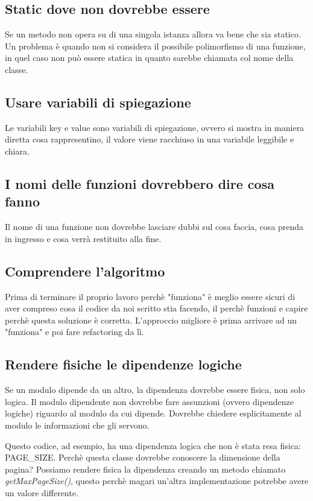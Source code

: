 \documentclass[11pt,a4paper]{book}
\begin{document}
\subsection{Static dove non dovrebbe essere}
Se un metodo non opera su di una singola istanza allora va bene che sia statico. Un problema è quando non si considera il possibile polimorfismo di una funzione, in quel caso non può essere statica in quanto sarebbe chiamata col nome della classe.

\subsection{Usare variabili di spiegazione}
\label{code: 067}
Le variabili key e value sono variabili di spiegazione, ovvero si mostra in maniera diretta cosa rappresentino, il valore viene racchiuso in una variabile leggibile e chiara.

\subsection{I nomi delle funzioni dovrebbero dire cosa fanno}
Il nome di una funzione non dovrebbe lasciare dubbi sul cosa faccia, cosa prenda in ingresso e cosa verrà restituito alla fine.

\subsection{Comprendere l'algoritmo}
Prima di terminare il proprio lavoro perchè "funziona" è meglio essere sicuri di aver compreso cosa il codice da noi scritto stia facendo, il perchè funzioni e capire perchè questa soluzione è corretta. L'approccio migliore è prima arrivare ad un "funziona" e poi fare refactoring da lì.

\subsection{Rendere fisiche le dipendenze logiche}
\label{code: 068}
Se un modulo dipende da un altro, la dipendenza dovrebbe essere fisica, non solo logica. Il modulo dipendente non dovrebbe fare assunzioni (ovvero dipendenze logiche) riguardo al modulo da cui dipende. Dovrebbe chiedere esplicitamente al modulo le informazioni che gli servono.

Questo codice, ad esempio, ha una dipendenza logica che non è stata resa fisica: PAGE\_SIZE. Perchè questa classe dovrebbe conoscere la dimensione della pagina?
Possiamo rendere fisica la dipendenza creando un metodo chiamato \emph{getMaxPageSize()}, questo perchè magari un'altra implementazione potrebbe avere un valore differente.
\end{document}

